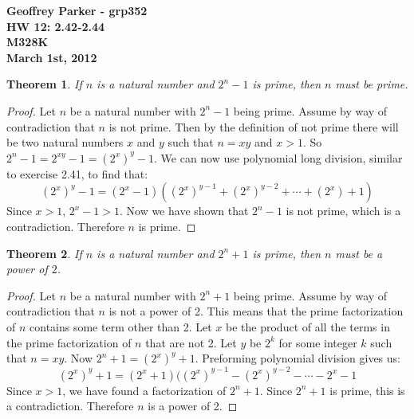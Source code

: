 \documentclass[12pt,leqno]{article}
\numberwithin{equation}{section}
\newtheorem{thm}{Theorem}[section]
\theoremstyle{definition}
\begin{document}
\thispagestyle{plain}
\begin{flushright}
\large{\textbf{Geoffrey Parker - grp352 \\
HW 12: 2.42-2.44\\
M328K \\
March 1st, 2012 \\}}
\end{flushright}

\markboth{}{} \setcounter{section}{0} \baselineskip=18pt

\setcounter{tocdepth}{4}



\setcounter{section}{2}

\setcounter{thm}{41}


\begin{thm}
If $n$ is a natural number and $2^n - 1$ is prime, then $n$ must be
prime.
\end{thm}

\begin{proof}[Proof]
Let $n$ be a natural number with $2^n - 1$ being prime.  Assume by way of contradiction that $n$ is not prime.  Then by the definition of not prime there will be two natural numbers $x$ and $y$ such that $n = xy$ and $x > 1$.  So $2^n - 1 = 2^{xy} - 1 = (2^x)^y - 1$.  We can now use polynomial long division, similar to exercise 2.41, to find that: 
\[(2^x)^y - 1 = (2^x-1)((2^x)^{y-1} + (2^x)^{y-2} + \cdots + (2^x) + 1)\]
Since $x > 1$, $2^x-1 > 1$.  Now we have shown that $2^n - 1$ is not prime, which is a contradiction.  Therefore $n$ is prime.
\end{proof}



\begin{thm}
If $n$ is a natural number and $2^n+1$ is prime, then $n$ must be a
power of $2$.
\end{thm}

\begin{proof}[Proof]
Let $n$ be a natural number with $2^n + 1$ being prime.  Assume by way of contradiction that $n$ is not a power of 2.  This means that the prime factorization of $n$ contains some term other than 2.  Let $x$ be the product of all the terms in the prime factorization of $n$ that are not 2.  Let $y$ be $2^k$ for some integer $k$ such that $n = xy$.  Now $2^n + 1 = (2^x)^y + 1$.  Preforming polynomial division gives us:
\[(2^x)^y + 1 = (2^x+1)((2^x)^{y-1} - (2^x)^{y-2} - \cdots - 2^x - 1\]
Since $x > 1$, we have found a factorization of $2^n + 1$.  Since $2^n + 1$ is prime, this is a contradiction.  Therefore $n$ is a power of 2.
\end{proof}
\end{document}
